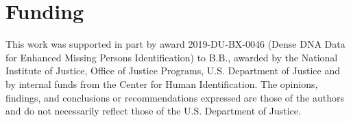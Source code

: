 \documentclass{bioinfo}
\begin{document}
\section*{Funding}

This work was supported in part by award 2019-DU-BX-0046 (Dense DNA Data
for Enhanced Missing Persons Identification) to B.B., awarded by the
National Institute of Justice, Office of Justice Programs, U.S.
Department of Justice and by internal funds from the Center for Human
Identification. The opinions, findings, and conclusions or
recommendations expressed are those of the authors and do not
necessarily reflect those of the U.S. Department of Justice.




\end{document}
